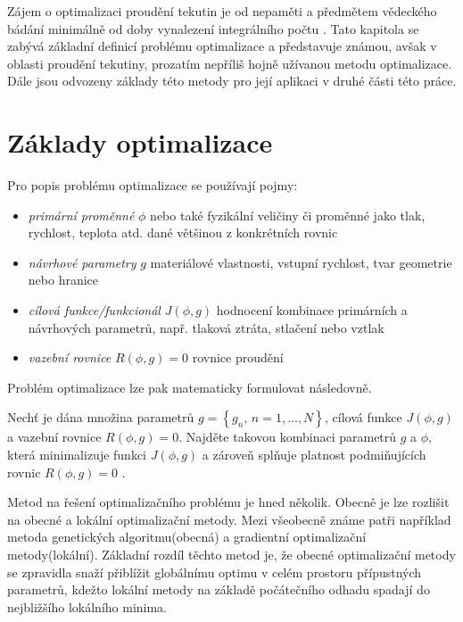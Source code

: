 Zájem o optimalizaci proudění tekutin je od nepaměti a předmětem vědeckého bádání minimálně od doby vynalezení integrálního počtu \cite{karman1997inverse}. Tato kapitola se zabývá základní definicí problému optimalizace a představuje známou, avšak v oblasti proudění tekutiny, prozatím nepříliš hojně užívanou metodu optimalizace. Dále jsou odvozeny základy této metody pro její aplikaci v druhé části této práce.
\section{Základy optimalizace}\label{sec:zaklady_opt}
Pro popis problému optimalizace se používají pojmy:
\begin{itemize}
	\item \textit{primární proměnné} $ \phi $ nebo také fyzikální veličiny či proměnné jako tlak, rychlost, teplota atd. dané většinou z konkrétních rovnic
	\item \textit{návrhové parametry} $ g $ materiálové vlastnosti, vstupní rychlost, tvar geometrie nebo hranice
	\item \textit{cílová funkce/funkcionál} $ J(\phi,g) $ hodnocení kombinace primárních a návrhových parametrů, např. tlaková ztráta, stlačení nebo vztlak
	\item \textit{vazební rovnice} $ R(\phi,g)=0 $ rovnice proudění
\end{itemize}
Problém optimalizace lze pak matematicky formulovat následovně. \cite{karman1997inverse}
\begin{problem}\label{prob:optimalizace}
Nechť je dána množina parametrů $ g=\left\lbrace g_n, \, n=1,...,N\right\rbrace $, cílová funkce $ J(\phi, g) $ a vazební rovnice $ R(\phi, g)=0 $. 
Najděte takovou kombinaci parametrů $ g $ a $ \phi $, která minimalizuje funkci $ J(\phi, g) $ a zároveň splňuje platnost podmiňujících rovnic $ R(\phi, g)=0$ . 
\end{problem}
Metod na řešení optimalizačního problému je hned několik.
Obecně je lze rozlišit na obecné a lokální optimalizační metody. Mezi všeobecně známe patři například metoda genetických algoritmu(obecná) a gradientní optimalizační metody(lokální). 
Základní rozdíl těchto metod je, že obecné optimalizační metody se zpravidla snaží přiblížit globálnímu optimu v celém prostoru přípustných parametrů, kdežto lokální metody na základě počátečního odhadu spadají do nejbližšího lokálního minima.

